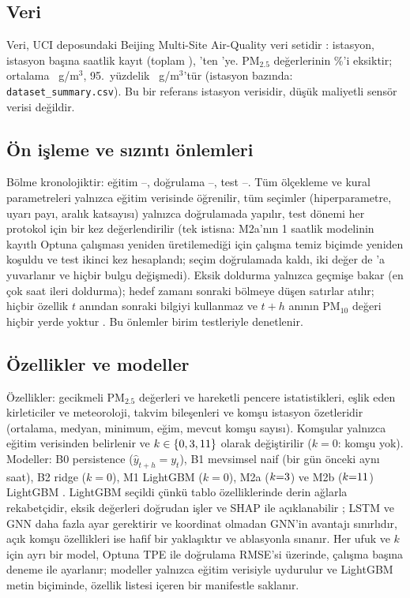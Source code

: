 \documentclass[conference]{IEEEtran}
\newcommand{\ugm}{\textmu g/m$^3$}
\newcommand{\pmtwo}{PM$_{2.5}$}
\begin{document}
\subsection{Veri}
Veri, UCI deposundaki Beijing Multi-Site Air-Quality veri setidir \cite{R8,R8d}: \nDataStations{} istasyon, istasyon başına \nDataHours{} saatlik kayıt (toplam \nDataRows{}), \nTrainStart{}'ten \nTestEnd{}'ye. \pmtwo{} değerlerinin \%\nDataMissingPct{}'i eksiktir; ortalama \nDataMean{}~\ugm{}, 95.\ yüzdelik \nDataPNinetyFive{}~\ugm{}'tür (istasyon bazında: \texttt{dataset\_summary.csv}). Bu bir referans istasyon verisidir, düşük maliyetli sensör verisi değildir.

\subsection{Ön işleme ve sızıntı önlemleri}
Bölme kronolojiktir: eğitim \nTrainStart{}--\nTrainEnd{}, doğrulama \nValStart{}--\nValEnd{}, test \nTestStart{}--\nTestEnd{}. Tüm ölçekleme ve kural parametreleri yalnızca eğitim verisinde öğrenilir, tüm seçimler (hiperparametre, uyarı payı, aralık katsayısı) yalnızca doğrulamada yapılır, test dönemi her protokol için bir kez değerlendirilir (tek istisna: M2a'nın 1 saatlik modelinin kayıtlı Optuna çalışması yeniden üretilemediği için çalışma temiz biçimde yeniden koşuldu ve test ikinci kez hesaplandı; seçim doğrulamada kaldı, iki değer de \nRmseMtwoaHOne{}'a yuvarlanır ve hiçbir bulgu değişmedi). Eksik doldurma yalnızca geçmişe bakar (en çok \nFfillLimit{} saat ileri doldurma); hedef zamanı sonraki bölmeye düşen satırlar atılır; hiçbir özellik $t$ anından sonraki bilgiyi kullanmaz ve $t{+}h$ anının PM$_{10}$ değeri hiçbir yerde yoktur \cite{R13,R16}. Bu önlemler birim testleriyle denetlenir.

\subsection{Özellikler ve modeller}
Özellikler: gecikmeli \pmtwo{} değerleri ve hareketli pencere istatistikleri, eşlik eden kirleticiler ve meteoroloji, takvim bileşenleri ve komşu istasyon özetleridir (ortalama, medyan, minimum, eğim, mevcut komşu sayısı). Komşular yalnızca eğitim verisinden belirlenir ve $k\in\{0,3{},11{}\}$ olarak değiştirilir ($k{=}0$: komşu yok). Modeller: B0 persistence ($\hat y_{t+h}=y_t$), B1 mevsimsel naif (bir gün önceki aynı saat), B2 ridge ($k{=}0$), M1 LightGBM ($k{=}0$), M2a ($k{=}3{}$) ve M2b ($k{=}11{}$) LightGBM \cite{R15}. LightGBM seçildi çünkü tablo özelliklerinde derin ağlarla rekabetçidir, eksik değerleri doğrudan işler ve SHAP ile açıklanabilir \cite{R26,R13,R14}; LSTM \cite{R9,R10} ve GNN \cite{R11,R12} daha fazla ayar gerektirir ve koordinat olmadan GNN'in avantajı sınırlıdır, açık komşu özellikleri ise hafif bir yaklaşıktır ve ablasyonla sınanır. Her ufuk ve $k$ için ayrı bir model, Optuna TPE ile doğrulama RMSE'si üzerinde, çalışma başına \nOptunaTrials{} deneme ile ayarlanır; modeller yalnızca eğitim verisiyle uydurulur ve LightGBM metin biçiminde, özellik listesi içeren bir manifestle saklanır.
\end{document}
